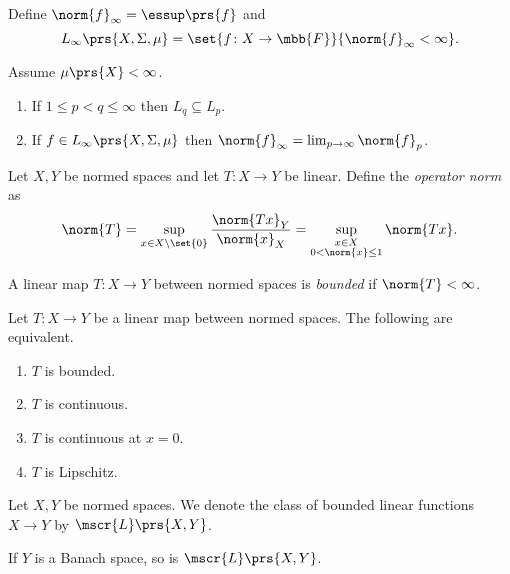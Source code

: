 \documentclass[10pt, twoside]{book}
\begin{document}
\begin{definition}[$L_\infty$]
Define
$\norm{f}_\infty = \essup\prs{f}$
and
\[L_\infty\prs{X, \Sigma, \mu} = \set{f \colon X \to \mbb{F}}{\norm{f}_\infty < \infty} \text{.}\]
\end{definition}

\begin{exercise}
Assume $\mu\prs{X} < \infty$.
\begin{enumerate}
\item If $1 \leq p < q \leq \infty$ then $L_q \subseteq L_p$.
\item If $f \in L_\infty \prs{X, \Sigma, \mu}$ then $\norm{f}_\infty = \lim_{p \to \infty} \norm{f}_p$.
\end{enumerate}
\end{exercise}

\begin{definition}
Let $X,Y$ be normed spaces and let $T \colon X \to Y$ be linear.
Define the \emph{operator norm} as
\[\norm{T} = \sup_{x \in X \setminus \set{0}} \frac{\norm{T x}_Y}{\norm{x}_X} = \sup_{\substack{x \in X \\ 0 < \norm{x} \leq 1}} \norm{Tx} \text{.}\]
\end{definition}

\begin{definition}
A linear map $T \colon X \to Y$ between normed spaces is \emph{bounded} if $\norm{T} < \infty$.
\end{definition}

\begin{fact}
Let $T \colon X \to Y$ be a linear map between normed spaces. The following are equivalent.
\begin{enumerate}
\item $T$ is bounded.
\item $T$ is continuous.
\item $T$ is continuous at $x = 0$.
\item $T$ is Lipschitz.
\end{enumerate}
\end{fact}

\begin{notation}
Let $X,Y$ be normed spaces.
We denote the class of bounded linear functions $X \to Y$ by $\mscr{L}\prs{X,Y}$.
\end{notation}

\begin{theorem}
If $Y$ is a Banach space, so is $\mscr{L}\prs{X,Y}$.
\end{theorem}
\end{document}
